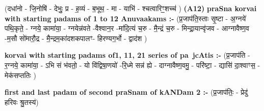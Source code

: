\documentclass[17pt]{extarticle}
\begin{document}
                  \newline
                      (दधा॑नो - जि॒नोषि॑ - देभुः॒ प्र - ह॒व्यं - ब॒भूथ॒ - मा - याभि॑ - श्चत्वारिꣳ॒॒शच्च॑ )  \textbf{(A12)} \newline \newline
                \textbf{praSna korvai with starting padams of 1 to 12 Anuvaakams :-} \newline
        (प्र॒जाप॑ति॒स्ताः सृ॒ष्टा - अ॒ग्नये॑ पथि॒कृते॒ - ग्नये॒ कामा॑या॒ - ग्नयेन्न॑वते -वैश्वान॒र -मा॑दि॒त्यं च॒रु - मै॒न्द्रं च॒रु - मिन्द्रा॒यान्वृ॑जव - आग्नावैष्ण॒व -म॒सौ सो॑मारौ॒द्र - मै॒न्द्रम॒का॑दशकपालꣳ- हिरण्यग॒र्भो - द्वाद॑श ) \newline

        \textbf{korvai with starting padams of1, 11, 21 series of pa~jcAtis :-} \newline
        (प्र॒जाप॑ति - र॒ग्नये॒ कामा॑या॒ - ऽभि सं भ॑वतो॒ - यो वि॑द्विषा॒णयो॑ -रि॒ध्मे सन्न॑ ह्ये - दाग्नावैष्ण॒वमु॒ - परि॑ष्टा॒ - द्यासि॑ दा॒श्वाꣳस॒ - मेक॑सप्ततिः ) \newline

        \textbf{first and last padam of second praSnam of kANDam 2 :-} \newline
        (प्र॒जाप॑तिः॒ - प्रेदु॑ हरिवः श्रु॒तस्य॑) \newline 
\end{document}
